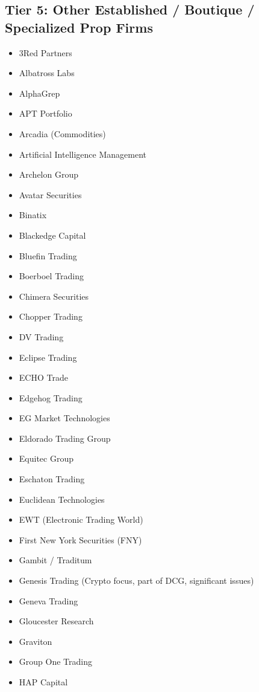 \documentclass[11pt,a4paper]{article}
\begin{document}
\subsection*{Tier 5: Other Established / Boutique / Specialized Prop Firms}
\begin{multicols}{3}
\begin{itemize}[label=\textbullet, leftmargin=*, itemsep=1pt, parsep=0pt]
    \item 3Red Partners
    \item Albatross Labs
    \item AlphaGrep
    \item APT Portfolio
    \item Arcadia (Commodities)
    \item Artificial Intelligence Management
    \item Archelon Group
    \item Avatar Securities
    \item Binatix
    \item Blackedge Capital
    \item Bluefin Trading
    \item Boerboel Trading
    \item Chimera Securities
    \item Chopper Trading
    \item DV Trading
    \item Eclipse Trading
    \item ECHO Trade
    \item Edgehog Trading
    \item EG Market Technologies
    \item Eldorado Trading Group
    \item Equitec Group
    \item Eschaton Trading
    \item Euclidean Technologies
    \item EWT (Electronic Trading World)
    \item First New York Securities (FNY)
    \item Gambit / Traditum
    \item Genesis Trading (Crypto focus, part of DCG, significant issues)
    \item Geneva Trading
    \item Gloucester Research
    \item Graviton
    \item Group One Trading
    \item HAP Capital

\end{itemize}
\end{multicols}
\end{document}
